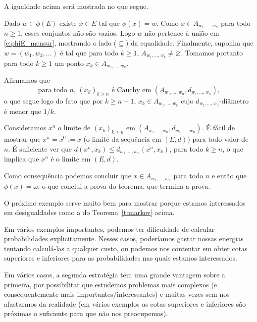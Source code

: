   A igualdade acima será mostrada no que segue.

  Dado $w \in \phi(E)$ existe $x \in E$ tal que $\phi(x) = w$.
  Como $x \in A_{w_1, \dots, w_n}$ para todo $n \geq 1$, esses conjuntos não são vazios.
  Logo $w$ não pertence à união em \eqref{e:phiE_mensur}, mostrando o lado ($\subseteq$) da equalidade.
  Finalmente, suponha que $w = (w_1, w_2, \dots)$ é tal que para todo $k \geq 1$, $A_{w_1, \dots, w_k} \neq \varnothing$.
  Tomamos portanto para todo $k \geq 1$ um ponto $x_k \in A_{w_1, \dots, w_k}$.

  Afirmamos que
  \begin{equation}
    \text{para todo $n$, $(x_k)_{k \geq n}$ é Cauchy em $(A_{w_1, \dots, w_n}, d_{w_1, \dots, w_n})$,}
  \end{equation}
 o que segue logo do fato que por $k \geq n+1$, $x_k \in A_{w_1, \dots, w_{k}}$ cujo $d_{w_1, \dots, w_{n}}$-diâmetro é menor que $1/k$.

 \medskip

 Consideramos $x^n$ o limite de $(x_k)_{k\ge n}$ em $(A_{w_1, \dots, w_n}, d_{w_1, \dots, w_n})$.
 É fácil de mostrar que $x^n=x^0:=x$ (o limite da sequência em $(E,d)$) para todo valor de $n$.
 É suficiente ver que  $d(x^n,x_k)\le d_{w_1, \dots, w_n}(x^n,x_k)$, para todo $k\ge n$, o que implica que $x^n$ é o limite em $(E,d)$.

 \medskip

 Como consequência podemos concluir que $x\in A_{w_1, \dots, w_n}$ para todo $n$ e então que $\phi(x)=\omega$, o que conclui a prova do teorema.
  que termina a prova.


O próximo exemplo serve muito bem para mostrar porque estamos interessados em desigualdades como a do Teorema~\ref{t:markov} acima.

Em vários exemplos importantes, podemos ter dificuldade de calcular probabilidades explicitamente.
Nesses casos, poderíamos gastar nossas energias tentando calculá-las a qualquer custo,
ou podemos nos contentar em obter cotas superiores e inferiores para as probabilidades nas quais estamos interessados.

Em vários casos, a segunda estratégia tem uma grande vantagem sobre a primeira, por possibilitar que estudemos problemas mais complexos
(e consequentemente mais importantes/interessantes) e muitas vezes sem nos afastarmos da realidade
(em vários exemplos as cotas superiores e inferiores são próximas o suficiente para que não nos preocupemos).





